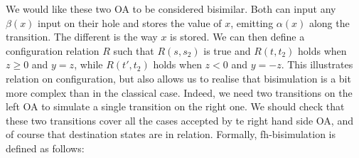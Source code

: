 \documentclass[runningheads]{llncs}
\begin{document}
We would like these two OA to be considered bisimilar. Both can input any $\beta(x)$ input on their hole and stores the value of $x$, emitting $\alpha(x)$ along the transition.
The different is the way $x$ is stored. We can then define a configuration relation $R$ such that $R(s,s_2)$ is true and $R(t,t_2)$ holds when $z\geq 0$ and $y=z$, while $R(t',t_2)$ holds when $z< 0$ and $y=-z$. This illustrates relation on configuration, but also allows us to realise that bisimulation is a bit more complex than in the classical case. Indeed, we need two transitions on the left OA to simulate a single transition on the right one. We should check that these two transitions cover all the cases accepted by te right hand side OA, and of course that destination states are in relation. Formally, fh-bisimulation is defined \cite{fhbisim} as follows:
\end{document}
